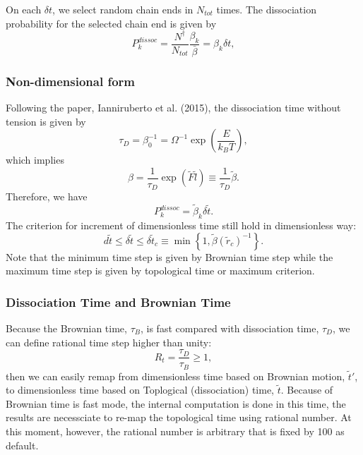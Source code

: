 \documentclass[10pt, a4paper]{article}
\begin{document}
On each $\delta t$, we select random chain ends in $N_{tot}$ times. The dissociation probability for the selected chain end is given by
\begin{equation}
P^{dissoc}_k = \frac{N^\dagger}{N_{tot}}\frac{\beta_k}{\bar{\beta}} = \beta_k\delta t,
\end{equation}

\subsubsection{Non-dimensional form}
Following the paper, Ianniruberto et al. (2015), the dissociation time without tension is given by
\begin{equation}
\tau_D = \beta_0^{-1} = \Omega^{-1}\exp\left(\frac{E}{k_BT}\right),
\end{equation}
which implies
\begin{equation}
\beta = \frac{1}{\tau_D}\exp(\tilde{F}\tilde{l}) \equiv \frac{1}{\tau_D}\tilde{\beta}.
\end{equation}
Therefore, we have
\begin{equation}
P^{dissoc}_k = \tilde{\beta}_k\delta \tilde{t}.
\end{equation}
The criterion for increment of dimensionless time still hold in dimensionless way:
\begin{equation}
  d\tilde{t} \leq \delta \tilde{t} \leq \delta \tilde{t}_c \equiv \min\left\{1, \tilde{\beta}(\tilde{r}_c)^{-1}\right\}.
  \label{eq:delta_t_criterion}
\end{equation}
Note that the minimum time step is given by Brownian time step while the maximum time step is given by topological time or maximum criterion.

\subsubsection{Dissociation Time and Brownian Time}
Because the Brownian time, $\tau_B$, is fast compared with dissociation time, $\tau_D$, we can define rational time step higher than unity:
\begin{equation}
R_t = \frac{\tau_D}{\tau_B} \geq 1, 
\end{equation}
then we can easily remap from dimensionless time based on Brownian motion, $\tilde{t}'$, to dimensionless time based on Toplogical (dissociation) time, $\tilde{t}$. Because of Brownian time is fast mode, the internal computation is done in this time, the results are necessciate to re-map the topological time using rational number. At this moment, however, the rational number is arbitrary that is fixed by 100 as default.
\end{document}
